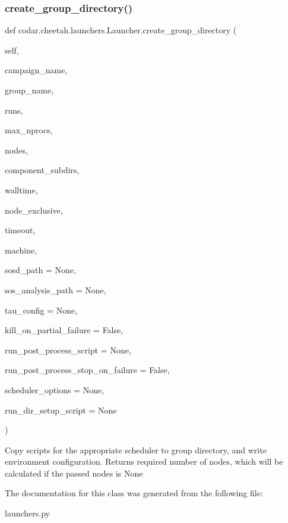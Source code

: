 \subsubsection{\texorpdfstring{create\+\_\+group\+\_\+directory()}{create\_group\_directory()}}
{\footnotesize\ttfamily def codar.\+cheetah.\+launchers.\+Launcher.\+create\+\_\+group\+\_\+directory (\begin{DoxyParamCaption}\item[{}]{self,  }\item[{}]{campaign\+\_\+name,  }\item[{}]{group\+\_\+name,  }\item[{}]{runs,  }\item[{}]{max\+\_\+nprocs,  }\item[{}]{nodes,  }\item[{}]{component\+\_\+subdirs,  }\item[{}]{walltime,  }\item[{}]{node\+\_\+exclusive,  }\item[{}]{timeout,  }\item[{}]{machine,  }\item[{}]{sosd\+\_\+path = {\ttfamily None},  }\item[{}]{sos\+\_\+analysis\+\_\+path = {\ttfamily None},  }\item[{}]{tau\+\_\+config = {\ttfamily None},  }\item[{}]{kill\+\_\+on\+\_\+partial\+\_\+failure = {\ttfamily False},  }\item[{}]{run\+\_\+post\+\_\+process\+\_\+script = {\ttfamily None},  }\item[{}]{run\+\_\+post\+\_\+process\+\_\+stop\+\_\+on\+\_\+failure = {\ttfamily False},  }\item[{}]{scheduler\+\_\+options = {\ttfamily None},  }\item[{}]{run\+\_\+dir\+\_\+setup\+\_\+script = {\ttfamily None} }\end{DoxyParamCaption})}

\begin{DoxyVerb}Copy scripts for the appropriate scheduler to group directory,
and write environment configuration. Returns required number of nodes,
which will be calculated if the passed nodes is None\end{DoxyVerb}
 

The documentation for this class was generated from the following file\+:\begin{DoxyCompactItemize}
\item 
launchers.\+py\end{DoxyCompactItemize}
